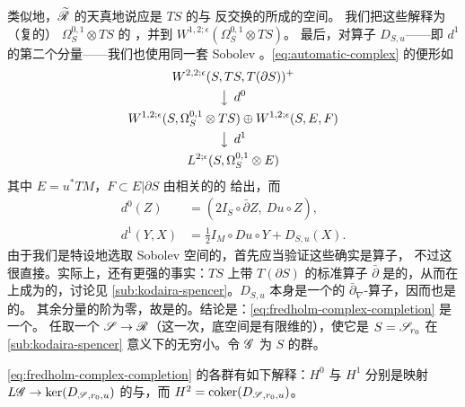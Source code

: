 类似地，$\widetilde{\mathscr{R}}$ 的\trTangentSpace{}天真地说应是 $TS$ 的与%
\trComplexStructure{}反交换的\trCompactlySupported{}\trEndomorphism{}所成的空间。%
我们把这些解释为（复的）\trTensorProduct\trLineBundle{} $\Omega^{0,1}_S\otimes TS$ 的%
\trSmooth{}\trSection，并\trCompletion{}到 $W^{1,2;\epsilon}(\Omega^{0,1}_S\otimes TS)$。%
最后，对\trLinearization{}算子 $D_{S,u}$——即 $d^1$ 的第二个分量——我们也使用同一套%
Sobolev \trTopology。\eqref{eq:automatic-complex} 的\trCompletion{}便形如
\begin{equation}\label{eq:fredholm-complex-completion}
\begin{gathered}
W^{2,2;\epsilon}(S,TS,T(\partial S))^{+}\\
\big\downarrow\;\, d^{0}\\
W^{1,2;\epsilon}(S,\Omega^{0,1}_S\otimes TS)\oplus W^{1,2;\epsilon}(S,E,F)\\
\big\downarrow\;\, d^{1}\\
L^{2;\epsilon}(S,\Omega^{0,1}_S\otimes E)
\end{gathered}
\end{equation}
其中 $E=u^*TM$，$F\subset E|\partial S$ 由相关的\trLagrange\trSubmanifold{}的%
\trTangentSpace{}给出，而
\begin{equation*}
\begin{aligned}
d^0(Z)&=(2I_S\circ\bar{\partial}Z,\ Du\circ Z),\\
d^1(Y,X)&=\tfrac{1}{2}I_M\circ Du\circ Y+D_{S,u}(X).
\end{aligned}
\end{equation*}
由于我们是特设地选取 Sobolev 空间的，首先应当验证这些确实是\trBounded{}算子，%
不过这很直接。实际上，还有更强的事实：$TS$ 上带\trBoundaryCondition{} $T(\partial S)$%
的标准\trCauchyRiemann{}算子 $\bar{\partial}$ 是\trAdmissible{}的，从而在\trWeighted%
\trSobolevSpace{}上成为\trFredholm{}的，讨论见 \cref{sub:kodaira-spencer}。$D_{S,u}$%
本身是一个\trNondegenerate{}的 $\bar{\partial}_\nabla$-算子，因而也是\trFredholm{}的。%
其余分量的阶为零，故是\trCompact{}的。结论是：\eqref{eq:fredholm-complex-completion}%
是一个\trFredholm\trComplex。
任取一个\trFamily{} $\mathscr{S}\to\mathscr{R}$（这一次，底空间是有限维的），使它是 $S=\mathscr{S}_{r_0}$%
在 \cref{sub:kodaira-spencer} 意义下的无穷小\trMiniversal{}\trDeformation。令 $\mathscr{G}$%
为 $S$ 的\trHolomorphic\trAutomorphism{}群。
\begin{lemma}\label{thm:fredholm-complex-cohomology}
\eqref{eq:fredholm-complex-completion} 的各\trCohomology{}群有如下解释：$H^0$ 与 $H^1$%
分别是映射 $L\mathscr{G}\to\ker(D_{\mathscr{S},r_0,u})$ 的\trKernel{}与\trCokernel，而%
$H^2=\mathrm{coker}(D_{\mathscr{S},r_0,u})$。
\end{lemma}
